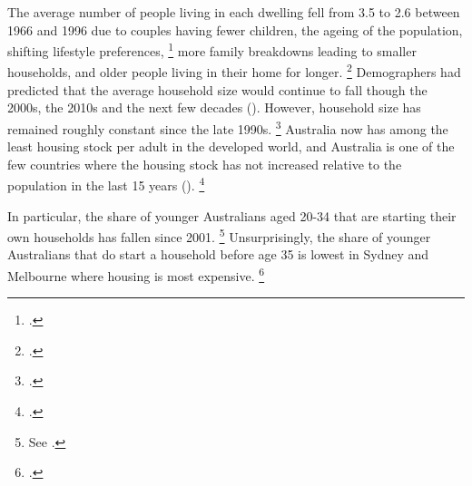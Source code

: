 The average number of people living in each dwelling fell from 3.5 to 2.6 between 1966 and 1996 due to couples having fewer children, the ageing of the population, shifting lifestyle preferences,%
    \footcites{Corsetti-2015-ABC-Childless-couples-to-be-modal-family-type}{AIFS-2015-Household-composition-Aust}
more family breakdowns leading to smaller households, and older people living in their home for longer.%
	\footcites{KohlerandvanderMerwe}{AIFS-2015-Household-composition-Aust}{ABS20016Censuspopulationhousing}{Eslake2013}[][Chapter~4]{AGoodHouse2008}
Demographers had predicted that the average household size would continue to fall though the 2000s, the 2010s and the next few decades ().
However, household size has remained roughly constant since the late 1990s.%
	\footcite{Capuano-2012-Our-expanding-households}
Australia now has among the least housing stock per adult in the developed world, and Australia is one of the few countries where the housing stock has not increased relative to the population in the last 15 years ().%
    \footcites[][59]{ResolutionFoundation-2018-Intl-comparisons-intergen-trends}{OECD2017housingdatabase}

In particular, the share of younger Australians aged 20-34 that are starting their own households has fallen since 2001.%
    \footnote{See .}
Unsurprisingly, the share of younger Australians that do start a household before age 35 is lowest in Sydney and Melbourne where housing is most expensive.%
    \footcite{Gradwell2017HousingBalance}

